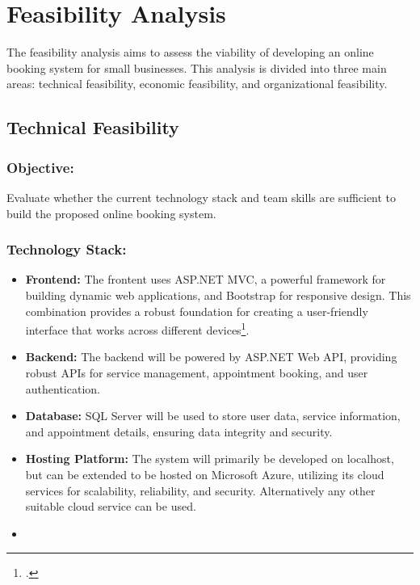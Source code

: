 \chapter{Feasibility Analysis}
\label{ch:feasibility-analysis}
The feasibility analysis aims to assess the viability of developing an online booking system for small businesses.
This analysis is divided into three main areas: technical feasibility, economic feasibility, and organizational feasibility.

\section{Technical Feasibility}
\label{sec:technical-feasibility}
\subsection*{Objective:}
\label{subsec:tf-objective}
Evaluate whether the current technology stack and team skills are sufficient to build the proposed online booking system.

\subsection*{Technology Stack:}
\label{subsec:tf-technology-stack}

\begin{itemize}
    \item \textbf{Frontend:} The frontent uses ASP.NET MVC, a powerful framework for building dynamic web applications, and Bootstrap for responsive design. This combination provides a robust foundation for creating a user-friendly interface that works across different devices\footcite[][]{missing}.
    \item \textbf{Backend:} The backend will be powered by ASP.NET Web API, providing robust APIs for service management, appointment booking, and user authentication.
    \item \textbf{Database:} SQL Server will be used to store user data, service information, and appointment details, ensuring data integrity and security.
    \item \textbf{Hosting Platform:} The system will primarily be developed on localhost, but can be extended to be hosted on Microsoft Azure, utilizing its cloud services for scalability, reliability, and security. Alternatively any other suitable cloud service can be used.
    \item 
\end{itemize}

